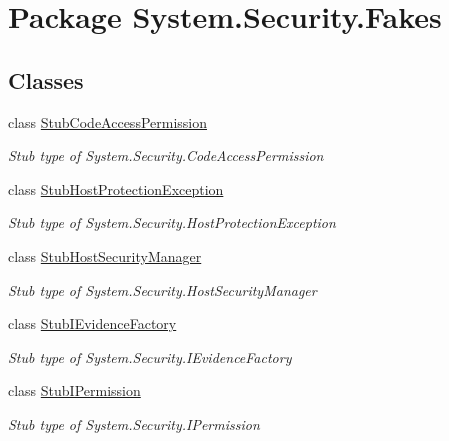 \hypertarget{namespace_system_1_1_security_1_1_fakes}{\section{Package System.\-Security.\-Fakes}
\label{namespace_system_1_1_security_1_1_fakes}
}
\subsection*{Classes}
\begin{DoxyCompactItemize}
\item 
class \hyperlink{class_system_1_1_security_1_1_fakes_1_1_stub_code_access_permission}{Stub\-Code\-Access\-Permission}
\begin{DoxyCompactList}\small\item\em Stub type of System.\-Security.\-Code\-Access\-Permission\end{DoxyCompactList}\item 
class \hyperlink{class_system_1_1_security_1_1_fakes_1_1_stub_host_protection_exception}{Stub\-Host\-Protection\-Exception}
\begin{DoxyCompactList}\small\item\em Stub type of System.\-Security.\-Host\-Protection\-Exception\end{DoxyCompactList}\item 
class \hyperlink{class_system_1_1_security_1_1_fakes_1_1_stub_host_security_manager}{Stub\-Host\-Security\-Manager}
\begin{DoxyCompactList}\small\item\em Stub type of System.\-Security.\-Host\-Security\-Manager\end{DoxyCompactList}\item 
class \hyperlink{class_system_1_1_security_1_1_fakes_1_1_stub_i_evidence_factory}{Stub\-I\-Evidence\-Factory}
\begin{DoxyCompactList}\small\item\em Stub type of System.\-Security.\-I\-Evidence\-Factory\end{DoxyCompactList}\item 
class \hyperlink{class_system_1_1_security_1_1_fakes_1_1_stub_i_permission}{Stub\-I\-Permission}
\begin{DoxyCompactList}\small\item\em Stub type of System.\-Security.\-I\-Permission\end{DoxyCompactList}\item 

\end{DoxyCompactItemize}
